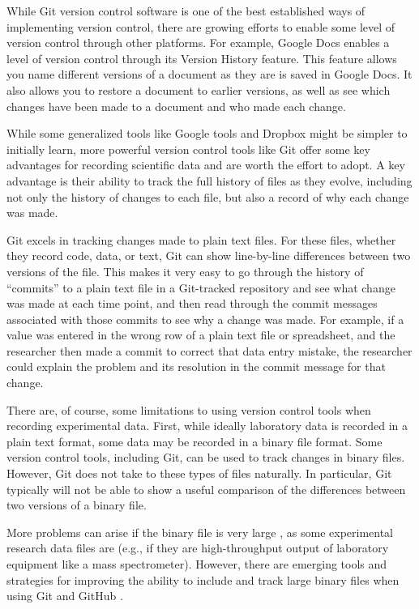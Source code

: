 \documentclass[]{tufte-book}
\begin{document}
While Git version control software is one of the best established ways
of implementing version control, there are growing efforts to enable some level
of version control through other platforms. For example, Google Docs enables a
level of version control through its Version History feature. This feature
allows you name different versions of a document as they are is saved in Google
Docs. It also allows you to restore a document to earlier versions, as well as
see which changes have been made to a document and who made each change.

While some generalized tools like Google tools and Dropbox might be simpler to
initially learn, more powerful version control tools like Git offer some key
advantages for recording scientific data and are worth the effort to adopt. A
key advantage is their ability to track the full history of files as they
evolve, including not only the history of changes to each file, but also a
record of why each change was made.

Git excels in tracking changes made to plain text files. For these files,
whether they record code, data, or text, Git can show line-by-line differences
between two versions of the file. This makes it very easy to go through the
history of ``commits'' to a plain text file in a Git-tracked repository and see
what change was made at each time point, and then read through the commit
messages associated with those commits to see why a change was made. For
example, if a value was entered in the wrong row of a plain text file or
spreadsheet, and the researcher then made a commit to correct that data entry
mistake, the researcher could explain the problem and its resolution in the
commit message for that change.

There are, of course, some limitations to using version control tools when
recording experimental data. First, while ideally laboratory data is recorded in
a plain text format, some data may be recorded in a binary file format. Some
version control tools, including Git, can be used to track changes in binary
files. However, Git does not take to these types of files naturally. In
particular, Git typically will not be able to show a useful comparison of
the differences between two versions of a binary file.

More problems can arise if the binary file is
very large \citep{perez2016ten, blischak2016quick}, as some experimental research
data files are (e.g., if they are high-throughput output of laboratory equipment
like a mass spectrometer). However, there are emerging tools and strategies for
improving the ability to include and track large binary files when using Git and
GitHub \citep{blischak2016quick}.
\end{document}
